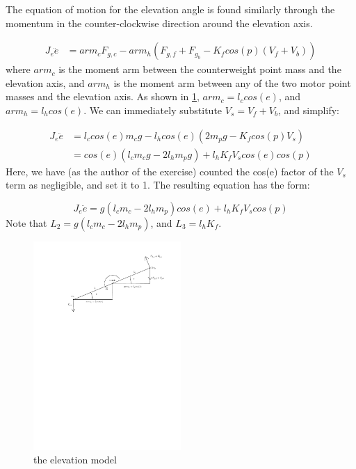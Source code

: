 The equation of motion for the elevation angle is found similarly
through the momentum in the counter-clockwise direction around the
elevation axis.

\begin{align*}
  J_e\ddot{e} &= arm_cF_{g,c} - arm_h(F_{g,f}+F_{g_b} - K_fcos(p)(V_f + V_b))
\end{align*}
where $arm_c$ is the moment arm between the counterweight point mass
and the elevation axis, and $arm_h$ is the moment arm between any of
the two motor point masses and the elevation axis. As shown in
\cref{fig:elevation_model}, $arm_c = l_ccos(e)$, and $arm_h =
l_hcos(e)$.  We can
immediately substitute $V_s = V_f + V_b$, and simplify:

\begin{align*}
  J_e\ddot{e} &= l_ccos(e)m_cg - l_hcos(e)(2m_pg - K_fcos(p)V_s) \\
              &= cos(e)(l_cm_cg - 2l_hm_pg) + l_hK_fV_scos(e)cos(p)
\end{align*}
Here, we have (as the author of the exercise) counted the cos(e)
factor of the $V_s$ term as negligible, and set it to 1.  The resulting equation has the form:

\begin{equation}
  J_e\ddot{e} = g(l_cm_c - 2l_hm_p)cos(e) + l_hK_fV_scos(p)
\end{equation}
Note that $L_2 = g(l_cm_c-2l_hm_p)$, and $L_3 = l_hK_f$.

\begin{figure}[H]
  \caption{the elevation model}
  \label{fig:elevation_model}
  \includegraphics[width=0.5\textwidth]{images/elevation_model}
\end{figure}

